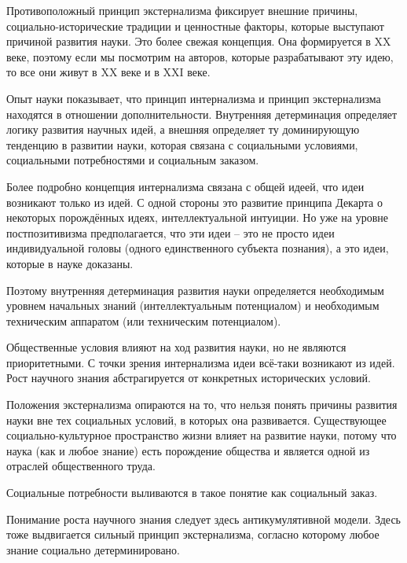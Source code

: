 \documentclass[main.tex]{subfiles}
\begin{document}
Противоположный принцип экстернализма фиксирует внешние причины, социально-исторические традиции и ценностные факторы, которые выступают причиной развития науки.
Это более свежая концепция.
Она формируется в XX веке, поэтому если мы посмотрим на авторов, которые разрабатывают эту идею, то все они живут в XX веке и в XXI веке.

Опыт науки показывает, что принцип интернализма и принцип экстернализма находятся в отношении дополнительности.
Внутренняя детерминация определяет логику развития научных идей, а внешняя определяет ту доминирующую тенденцию в развитии науки, которая связана с социальными условиями, социальными потребностями и социальным заказом.



Более подробно концепция интернализма связана с общей идеей, что идеи возникают только из идей.
С одной стороны это развитие принципа Декарта о некоторых порождённых идеях, интеллектуальной интуиции.
Но уже на уровне постпозитивизма предполагается, что эти идеи -- это не просто идеи индивидуальной головы (одного единственного субъекта познания), а это идеи, которые в науке доказаны.

Поэтому внутренняя детерминация развития науки определяется необходимым уровнем начальных знаний (интеллектуальным потенциалом) и необходимым техническим аппаратом (или техническим потенциалом).

Общественные условия влияют на ход развития науки, но не являются приоритетными.
С точки зрения интернализма идеи всё-таки возникают из идей.
Рост научного знания абстрагируется от конкретных исторических условий.



Положения экстернализма опираются на то, что нельзя понять причины развития науки вне тех социальных условий, в которых она развивается.
Существующее социально-культурное пространство жизни влияет на развитие науки, потому что наука (как и любое знание) есть порождение общества и является одной из отраслей общественного труда.

Социальные потребности выливаются в такое понятие как социальный заказ.

Понимание роста научного знания следует здесь антикумулятивной модели.
Здесь тоже выдвигается сильный принцип экстернализма, согласно которому любое знание социально детерминировано.
\end{document}
